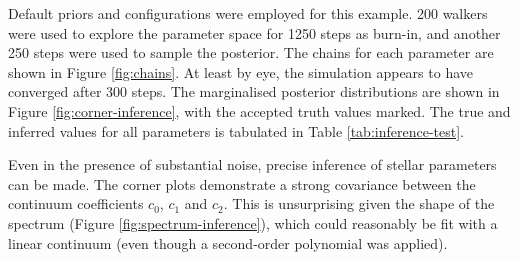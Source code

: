 \documentclass{aastex}
\begin{document}
Default priors and configurations were employed for this example. 200 walkers were used to explore the parameter space for 1250 steps as burn-in, and another 250 steps were used to sample the posterior. The chains for each parameter are shown in Figure \ref{fig:chains}. At least by eye, the simulation appears to have converged after 300 steps. The marginalised posterior distributions are shown in Figure \ref{fig:corner-inference}, with the accepted truth values marked. The true and inferred values for all parameters is tabulated in Table \ref{tab:inference-test}. 

Even in the presence of substantial noise, precise inference of stellar parameters can be made. The corner plots demonstrate a strong covariance between the continuum coefficients $c_0$, $c_1$ and $c_2$. This is unsurprising given the shape of the spectrum (Figure \ref{fig:spectrum-inference}), which could reasonably be fit with a linear continuum (even though a second-order polynomial was applied). 


\end{document}
